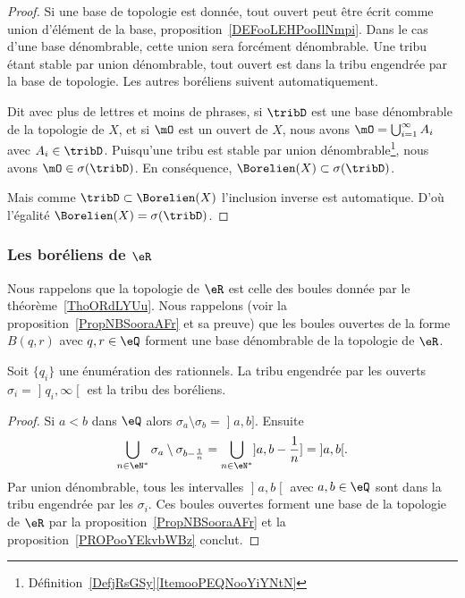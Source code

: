 \begin{proof}
	Si une base de topologie est donnée, tout ouvert peut être écrit comme union d'élément de la base, proposition~\ref{DEFooLEHPooIlNmpi}. Dans le cas d'une base dénombrable, cette union sera forcément dénombrable. Une tribu étant stable par union dénombrable, tout ouvert est dans la tribu engendrée par la base de topologie. Les autres boréliens suivent automatiquement.

	Dit avec plus de lettres et moins de phrases, si \( \tribD\) est une base dénombrable de la topologie de \( X\), et si \( \mO\) est un ouvert de \( X\), nous avons \( \mO=\bigcup_{i=1}^{\infty}A_i\) avec \( A_i\in\tribD\). Puisqu'une tribu est stable par union dénombrable\footnote{Définition~\ref{DefjRsGSy}\ref{ItemooPEQNooYiYNtN}}, nous avons \( \mO\in\sigma(\tribD)\). En conséquence, \( \Borelien(X)\subset\sigma(\tribD)\).

	Mais comme \( \tribD\subset\Borelien(X)\) l'inclusion inverse est automatique. D'où l'égalité \( \Borelien(X)=\sigma(\tribD)\).
\end{proof}

\subsubsection{Les boréliens de \texorpdfstring{\(  \eR\)}{R}}

Nous rappelons que la topologie de \( \eR\) est celle des boules donnée par le théorème~\ref{ThoORdLYUu}. Nous rappelons (voir la proposition~\ref{PropNBSooraAFr} et sa preuve) que les boules ouvertes de la forme \( B(q,r)\) avec \( q,r\in \eQ\) forment une base dénombrable de la topologie de \( \eR\).

\begin{lemma}   \label{LemZXnAbtl}
	Soit \( \{ q_i \}\) une énumération des rationnels. La tribu engendrée par les ouverts \( \sigma_i=\mathopen] q_i , \infty \mathclose[\) est la tribu des boréliens.
\end{lemma}

\begin{proof}
	Si \( a<b\) dans \( \eQ\) alors \( \sigma_a\setminus\sigma_b=\mathopen] a , b \mathclose]\). Ensuite
	\begin{equation}
		\bigcup_{n\in \eN^*}\sigma_a\setminus\sigma_{b-\frac{1}{ n }}=\bigcup_{n\in \eN^*}\mathopen] a , b-\frac{1}{ n } \mathclose]=\mathopen] a , b \mathclose[.
	\end{equation}
	Par union dénombrable, tous les intervalles \( \mathopen] a , b \mathclose[\) avec \( a,b\in \eQ\) sont dans la tribu engendrée par les \( \sigma_i\). Ces boules ouvertes forment une base de la topologie de \( \eR\) par la proposition~\ref{PropNBSooraAFr} et la proposition~\ref{PROPooYEkvbWBz} conclut.
\end{proof}

